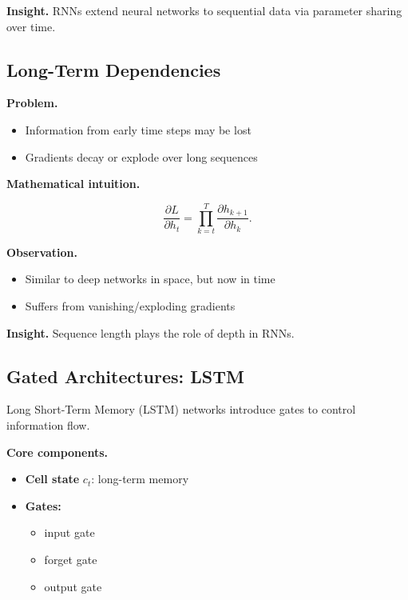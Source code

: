 \medskip

\noindent
\textbf{Insight.}  
RNNs extend neural networks to sequential data via parameter sharing over time.

\subsection{Long-Term Dependencies}

\textbf{Problem.}

\begin{itemize}
    \item Information from early time steps may be lost
    \item Gradients decay or explode over long sequences
\end{itemize}

\medskip

\noindent
\textbf{Mathematical intuition.}

\[
\frac{\partial L}{\partial h_t}
= \prod_{k=t}^{T} \frac{\partial h_{k+1}}{\partial h_k}.
\]

\medskip

\noindent
\textbf{Observation.}

\begin{itemize}
    \item Similar to deep networks in space, but now in time
    \item Suffers from vanishing/exploding gradients
\end{itemize}

\medskip

\noindent
\textbf{Insight.}  
Sequence length plays the role of depth in RNNs.

\subsection{Gated Architectures: LSTM}

Long Short-Term Memory (LSTM) networks introduce gates to control information flow.

\medskip

\noindent
\textbf{Core components.}

\begin{itemize}
    \item \textbf{Cell state} $c_t$: long-term memory
    \item \textbf{Gates:}
    \begin{itemize}
        \item input gate
        \item forget gate
        \item output gate
    \end{itemize}
\end{itemize}

